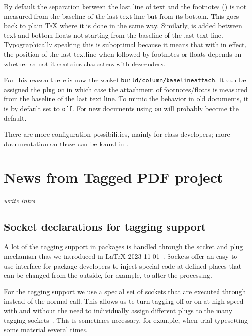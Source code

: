 \documentclass{ltnews}
\providecommand\socket[1]{\texttt{#1}}
\providecommand\plug[1]{\texttt{#1}}
\begin{document}
By default the separation between the last line of text and the
footnotes () is not measured from the baseline of
the last text line but from its bottom. This goes back to plain \TeX{}
where it is done in the same way.  Similarly,  is
added between text and bottom floats not starting from the baseline of
the last text line. Typographically speaking this is suboptimal
because it means that with  in effect, the position of
the last textline when followed by footnotes or floats depends on
whether or not it contains characters with descenders.

For this reason there is now the socket
\socket{build/column/baselineattach}. It can be assigned the plug
\plug{on} in which case the attachment of footnotes/floats is measured
from the baseline of the last text line. To mimic the behavior in old
documents, it is by default set to \plug{off}. For new documents using
 \plug{on} will probably become the default.

There are more configuration possibilities, mainly for class
developers; more documentation on those can be found in
\cite[\S54 ltoutput.dtx]{41:source2e}.


\section{News from Tagged PDF project}

\emph{write intro}


\subsection{Socket declarations for tagging  support}

A lot of the tagging support in packages is handled through the socket
and plug mechanism that we introduced in \LaTeX{}
2023-11-01~\cite{41:ltnews38}. Sockets offer an easy to use interface
for package developers to inject special code at defined places that
can be changed from the outside, for example, to alter the processing.

For the tagging support we use a special set of sockets that are
executed through  instead of the normal
 call. This allows us to turn tagging off or on at high
speed with  and  without the need
to individually assign different plugs to the many tagging
sockets~\cite{41:ltnews39}. This is sometimes necessary, for example,
when trial typesetting some material several times.
\end{document}
